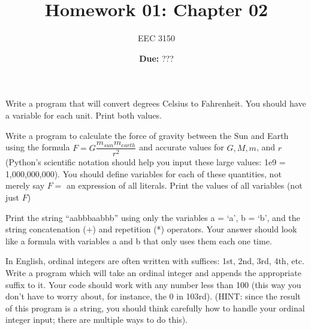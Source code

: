 \documentclass[12pt]{article}%
\begin{document}
\title{Homework 01: Chapter 02}

\author{EEC 3150}
\date{\textbf{Due:} ???}

\maketitle

\begin{center}
\end{center}


\begin{Exercise}[origin={10 points}]

Write a program that will convert degrees Celsius to Fahrenheit. You should have a variable for each unit. Print both values.

\end{Exercise}


\begin{Exercise}[origin={10 points}]

Write a program to calculate the force of gravity between the Sun and Earth using the formula $F = G \dfrac{m_{sun}m_{earth}}{r^2}$ and accurate values for $G, M, m$, and $r$ (Python's scientific notation should help you input these large values: 1e9 = 1,000,000,000). You should define variables for each of these quantities, not merely say $F =$ an expression of all literals. Print the values of all variables (not just $F$)

\end{Exercise}


\begin{Exercise}[origin={10 points}]

Print the string ``aabbbaabbb'' using only the variables a = `a', b = `b', and the string concatenation (+) and repetition (*) operators. Your answer should look like a formula with variables a and b that only uses them each one time.

\end{Exercise}


\begin{Exercise}[origin={10 points}]

In English, ordinal integers are often written with suffices: 1st, 2nd, 3rd, 4th, etc. Write a program which will take an ordinal integer and appends the appropriate suffix to it. Your code should work with any number less than 100 (this way you don't have to worry about, for instance, the 0 in 103rd). (HINT: since the result of this program is a string, you should think carefully how to handle your ordinal integer input; there are multiple ways to do this).

\end{Exercise}
\end{document}
